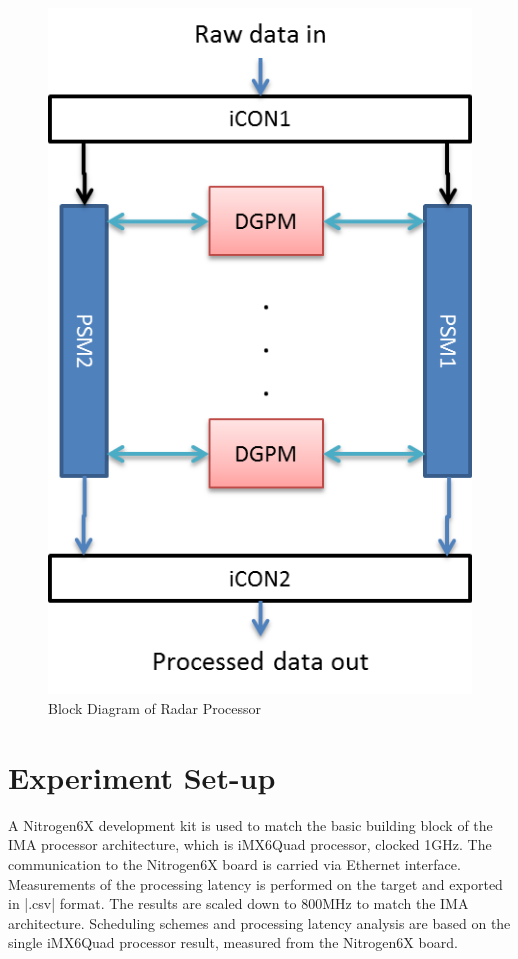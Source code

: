 \begin{figure}[h!]
	\centering
	\includegraphics[]{figures/radar_processor}
	\caption{Block Diagram of Radar Processor \cite{fcas}}
	\label{fig:bg_related_work:ima:radar_processor}
\end{figure}

\section{Experiment Set-up}
\label{s:bg_related_work:exp_setup}
A Nitrogen6X development kit is used to match the basic building block of the IMA processor architecture, which is iMX6Quad processor, clocked 1GHz. The communication to the Nitrogen6X board is carried via Ethernet interface. Measurements of the processing latency is performed on the target and exported in \bverb|.csv| format. The results are scaled down to 800MHz to match the IMA architecture. Scheduling schemes and processing latency analysis are based on the single iMX6Quad processor result, measured from the Nitrogen6X board.

